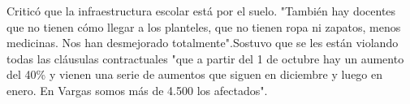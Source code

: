 \documentclass{article}%
\begin{document}
\newline%
%
Criticó que la infraestructura escolar está por el suelo. "También hay docentes que no tienen cómo llegar a los planteles, que no tienen ropa ni zapatos, menos medicinas. Nos han desmejorado totalmente".Sostuvo que se les están violando todas las cláusulas contractuales "que a partir del 1 de octubre hay un aumento del 40\% y vienen una serie de aumentos que siguen en diciembre y luego en enero. En Vargas somos más de 4.500 los afectados".%
\newline%
%
\end{document}
